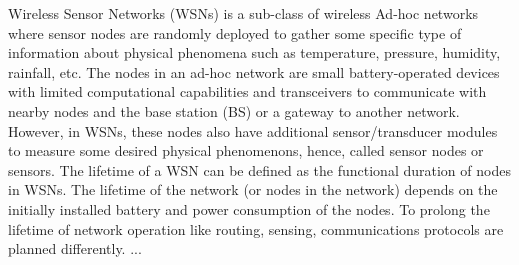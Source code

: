 Wireless Sensor Networks (WSNs) is a sub-class of wireless Ad-hoc networks where sensor nodes are randomly deployed to gather some specific type of information about physical phenomena such as temperature, pressure, humidity, rainfall, etc. The nodes in an ad-hoc network are small battery-operated devices with limited computational capabilities and transceivers to communicate with nearby nodes and the base station (BS) or a gateway to another network. However, in WSNs, these nodes also have additional sensor/transducer modules to measure some desired physical phenomenons, hence, called sensor nodes or sensors. The lifetime of a WSN can be defined as the functional duration of nodes in WSNs. The lifetime of the network (or nodes in the network) depends on the initially installed battery and power consumption of the nodes. To prolong the lifetime of network operation like routing, sensing, communications protocols are planned differently.
...


